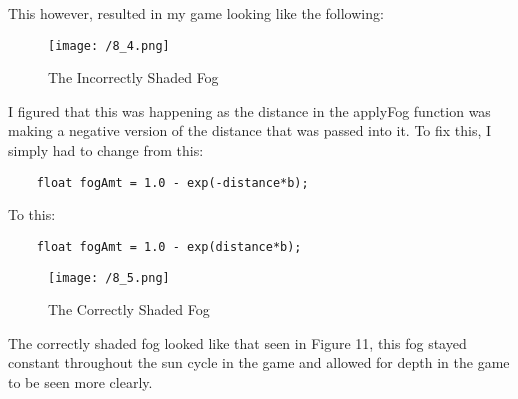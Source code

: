 \documentclass[11pt, oneside, a4paper]{article}
\begin{document}
This however, resulted in my game looking like the following:
\begin{figure}[!ht]
	\centerline{\texttt{[image: /8\_4.png]}}
	\caption{The Incorrectly Shaded Fog}
	\label{fig:figure10}
\end{figure}

\newpage
I figured that this was happening as the distance in the applyFog function was making a negative version of the distance that was passed into it. To fix this, I simply had to change from this:
\begin{lstlisting}
    float fogAmt = 1.0 - exp(-distance*b);
\end{lstlisting}
To this:
\begin{lstlisting}
    float fogAmt = 1.0 - exp(distance*b);
\end{lstlisting}

\begin{figure}[!ht]
	\centerline{\texttt{[image: /8\_5.png]}}
	\caption{The Correctly Shaded Fog}
	\label{fig:figure10}
\end{figure}
The correctly shaded fog looked like that seen in Figure 11, this fog stayed constant throughout the sun cycle in the game and allowed for depth in the game to be seen more clearly.
\end{document}
